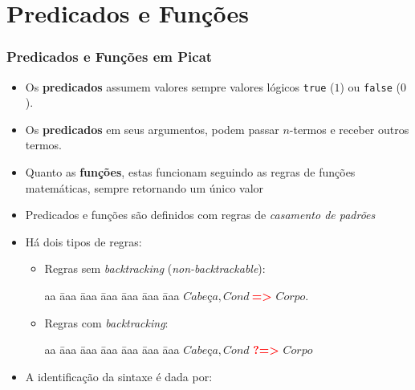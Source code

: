 \section{Predicados e Funções}


\begin{frame}[fragile,allowframebreaks=0.8,c]
	\frametitle{Predicados e Funções em Picat}
    
    \begin{itemize}

\item Os \textbf{predicados} assumem valores sempre valores lógicos \texttt{true} ($1$) ou \texttt{false} ($0$).

\item Os \textbf{predicados} em seus argumentos, podem passar $n$-termos e receber
outros termos.

\item Quanto as \textbf{funções}, estas funcionam seguindo as regras de funções matemáticas,
sempre retornando um único valor

        \item Predicados e funções são definidos com regras de \textit{casamento de padrões}
        
        
        \item Há dois tipos de regras:
        \pause
        \begin{itemize}
            \item Regras sem {\em backtracking} (\textit{non-backtrackable}):
        	
            \begin{tabbing}
              aa \= aaa \= aaa \= aaa \= aaa \= aaa \= aaa \kill
              \> \> $Cabe$ç$a, Cond\ $\textbf{\textcolor{red}{=>}} $Corpo$. 
            \end{tabbing}
            
            \pause
            \item Regras com {\em backtracking}:
            
            \begin{tabbing}
              aa \= aaa \= aaa \= aaa \= aaa \= aaa \= aaa \kill
              \> \> $Cabe$ç$a, Cond$ \textbf{\textcolor{red}{?=>}} $Corpo$ 
            \end{tabbing}
        
        \end{itemize}
        
        \item A identificação da sintaxe é dada por:
        

\end{itemize}
\end{frame}
